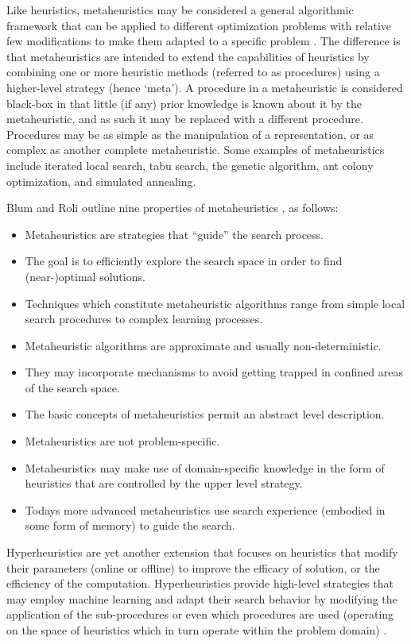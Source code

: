 \begin{bibunit}
Like heuristics, metaheuristics may be considered a general algorithmic framework that can be applied to different optimization problems with relative few modifications to make them adapted to a specific problem \cite{Glover2003, Talbi2009}. The difference is that metaheuristics are intended to extend the capabilities of heuristics by combining one or more heuristic methods (referred to as procedures) using a higher-level strategy (hence `meta'). A procedure in a metaheuristic is considered black-box in that little (if any) prior knowledge is known about it by the metaheuristic, and as such it may be replaced with a different procedure. Procedures may be as simple as the manipulation of a representation, or as complex as another complete metaheuristic. Some examples of metaheuristics include iterated local search, tabu search, the genetic algorithm, ant colony optimization, and simulated annealing.

Blum and Roli outline nine properties of metaheuristics \cite{Blum2003}, as follows: 
\begin{itemize}
	\item Metaheuristics are strategies that ``guide'' the search process.
	\item The goal is to efficiently explore the search space in order to find (near-)optimal solutions.
	\item Techniques which constitute metaheuristic algorithms range from simple local search procedures to complex learning processes.
	\item Metaheuristic algorithms are approximate and usually non-deterministic.
	\item They may incorporate mechanisms to avoid getting trapped in confined areas of the search space.
	\item The basic concepts of metaheuristics permit an abstract level description.
	\item Metaheuristics are not problem-specific.
	\item Metaheuristics may make use of domain-specific knowledge in the form of heuristics that are controlled by the upper level strategy.
	\item Todays more advanced metaheuristics use search experience (embodied in some form of memory) to guide the search.
\end{itemize}

Hyperheuristics are yet another extension that focuses on heuristics that modify their parameters (online or offline) to improve the efficacy of solution, or the efficiency of the computation. Hyperheuristics provide high-level strategies that may employ machine learning and adapt their search behavior by modifying the application of the sub-procedures or even which procedures are used (operating on the space of heuristics which in turn operate within the problem domain) \cite{Burke2003a, Burke2003}. 


\end{bibunit}
